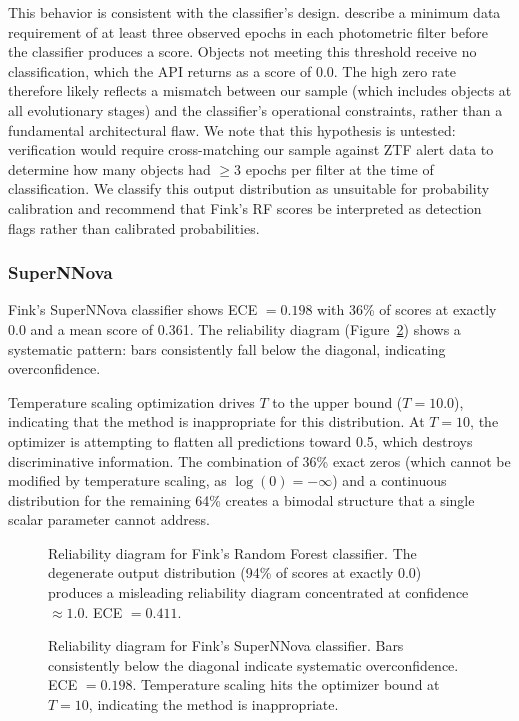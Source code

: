 \documentclass[twocolumn]{aastex631}
\begin{document}
This behavior is consistent with the classifier's design. \citet{leoni2022} describe a minimum data requirement of at least three observed epochs in each photometric filter before the classifier produces a score. Objects not meeting this threshold receive no classification, which the API returns as a score of 0.0. The high zero rate therefore likely reflects a mismatch between our sample (which includes objects at all evolutionary stages) and the classifier's operational constraints, rather than a fundamental architectural flaw. We note that this hypothesis is untested: verification would require cross-matching our sample against ZTF alert data to determine how many objects had $\geq$3 epochs per filter at the time of classification. We classify this output distribution as unsuitable for probability calibration and recommend that Fink's RF scores be interpreted as detection flags rather than calibrated probabilities.

\subsubsection{SuperNNova}

Fink's SuperNNova classifier \citep{moller2020} shows ECE $= 0.198$ with 36\% of scores at exactly 0.0 and a mean score of 0.361. The reliability diagram (Figure~\ref{fig:fink_snn}) shows a systematic pattern: bars consistently fall below the diagonal, indicating overconfidence.

Temperature scaling optimization drives $T$ to the upper bound ($T = 10.0$), indicating that the method is inappropriate for this distribution. At $T = 10$, the optimizer is attempting to flatten all predictions toward 0.5, which destroys discriminative information. The combination of 36\% exact zeros (which cannot be modified by temperature scaling, as $\log(0) = -\infty$) and a continuous distribution for the remaining 64\% creates a bimodal structure that a single scalar parameter cannot address.

\begin{figure}
\caption{Reliability diagram for Fink's Random Forest classifier. The degenerate output distribution (94\% of scores at exactly 0.0) produces a misleading reliability diagram concentrated at confidence $\approx 1.0$. ECE $= 0.411$. \label{fig:fink_rf}}
\end{figure}

\begin{figure}
\caption{Reliability diagram for Fink's SuperNNova classifier. Bars consistently below the diagonal indicate systematic overconfidence. ECE $= 0.198$. Temperature scaling hits the optimizer bound at $T = 10$, indicating the method is inappropriate. \label{fig:fink_snn}}
\end{figure}
\end{document}
